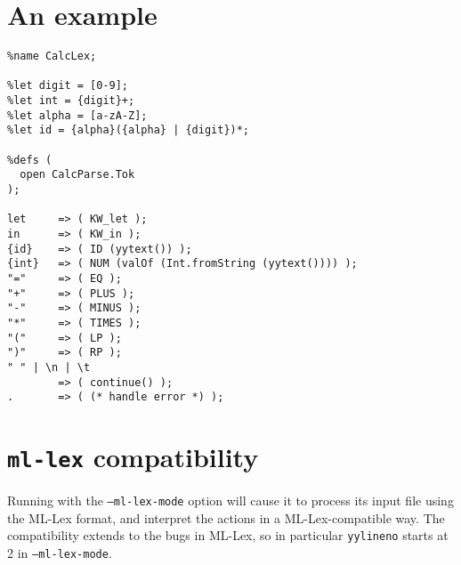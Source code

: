 \section{An example}
\begin{verbatim}
%name CalcLex;

%let digit = [0-9];
%let int = {digit}+;
%let alpha = [a-zA-Z];
%let id = {alpha}({alpha} | {digit})*;

%defs (
  open CalcParse.Tok
);

let     => ( KW_let );
in      => ( KW_in );
{id}    => ( ID (yytext()) );
{int}   => ( NUM (valOf (Int.fromString (yytext()))) );
"="     => ( EQ );
"+"     => ( PLUS );
"-"     => ( MINUS );
"*"     => ( TIMES );
"("     => ( LP );
")"     => ( RP );
" " | \n | \t
        => ( continue() );
.       => ( (* handle error *) );
\end{verbatim}

\section{{\tt ml-lex} compatibility}\label{sec:lex-compat}

Running \ulex{} with the {\tt --ml-lex-mode} option will cause it to process its input file using the ML-Lex format, and interpret the actions in a ML-Lex-compatible way.  The compatibility extends to the bugs in ML-Lex, so in particular \texttt{yylineno} starts at 2 in {\tt --ml-lex-mode}.